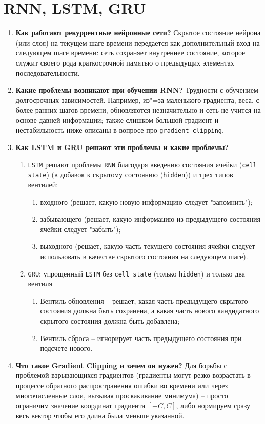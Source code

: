 \documentclass{article}
\begin{document}
\section{RNN, LSTM, GRU}
\begin{enumerate}
    \item \textbf{Как работают рекуррентные нейронные сети?} Скрытое состояние нейрона (или слоя) на текущем шаге времени передается как дополнительный вход на следующем шаге времени: сеть сохраняет внутреннее состояние, которое служит своего рода краткосрочной памятью о предыдущих элементах последовательности.
    \item \textbf{Какие проблемы возникают при обучении RNN?} Трудности с обучением долгосрочных зависимостей. Например, из"=за маленького градиента, веса, с более ранних шагов времени, обновляются незначительно и сеть не учится на основе давней информации; также слишком большой градиент и нестабильность ниже описаны в вопросе про \texttt{gradient clipping}.
    \item \textbf{Как LSTM и GRU решают эти проблемы и какие проблемы?} 
    \begin{enumerate}
        \item \texttt{LSTM} решают проблемы \texttt{RNN} благодаря введению состояния ячейки (\texttt{cell state}) (в добавок к скрытому состоянию (\texttt{hidden})) и трех типов вентилей: 
        \begin{enumerate}
            \item входного (решает, какую новую информацию следует "запомнить");
            \item забывающего (решает, какую информацию из предыдущего состояния ячейки следует "забыть");
            \item выходного (решает, какую часть текущего состояния ячейки следует использовать в качестве скрытого состояния на следующем шаге).
        \end{enumerate}
        \item \texttt{GRU}: упрощенный \texttt{LSTM} без \texttt{cell state} (только \texttt{hidden}) и только два вентиля 
        \begin{enumerate}
            \item Вентиль обновления -- решает, какая часть предыдущего скрытого состояния должна быть сохранена, а какая часть нового кандидатного скрытого состояния должна быть добавлена; 
            \item Вентиль сброса -- игнорирует часть предыдущего состояния при подсчете нового.
        \end{enumerate}
    \end{enumerate}
    \item \textbf{Что такое Gradient Clipping и зачем он нужен?} Для борьбы с проблемой взрывающихся градиентов (градиенты могут резко возрастать в процессе обратного распространения ошибки во времени или через многочисленные слои, вызывая проскакивание минимума) -- просто ограничим значение координат градиента $[-C, C]$, либо нормируем сразу весь вектор чтобы его длина была меньше указанной.
\end{enumerate}
\end{document}

